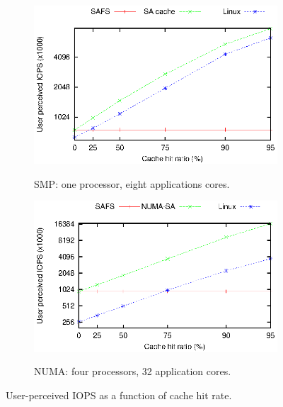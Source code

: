 \begin{figure}[tb]
\centering
\footnotesize
\begin{subfigure}{.5\textwidth}
	\includegraphics{figs/SAFS/new-SA-cache-hits.eps}
	\label{sa_cache}
\vspace{-15pt}
\caption{SMP: one processor, eight applications cores.}
\end{subfigure}

\begin{subfigure}{.5\textwidth}
	\includegraphics{figs/SAFS/new-NUMA-SA-hits.eps}
	\label{numa_cache}
\vspace{-15pt}
\caption{NUMA: four processors, 32 application cores.}
\end{subfigure}
\caption{User-perceived IOPS as a function of cache hit rate.}
\label{SA_iops}
\end{figure}




